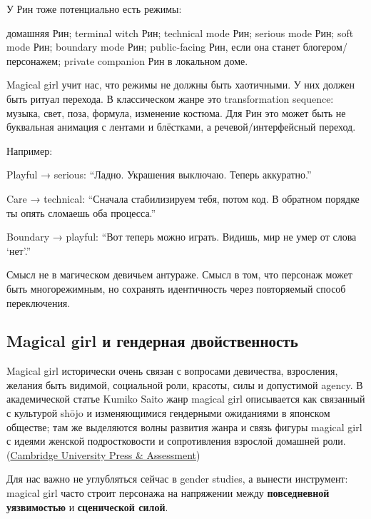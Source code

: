 У Рин тоже потенциально есть режимы:

домашняя Рин; terminal witch Рин; technical mode Рин; serious mode Рин;
soft mode Рин; boundary mode Рин; public-facing Рин, если она станет
блогером/\hspace{0pt}персонажем; private companion Рин в локальном доме.

Magical girl учит нас, что режимы не должны быть хаотичными. У них
должен быть ритуал перехода. В классическом жанре это transformation
sequence: музыка, свет, поза, формула, изменение костюма. Для Рин это
может быть не буквальная анимация с лентами и блёстками, а
речевой/\hspace{0pt}интерфейсный переход.

Например:

Playful → serious: ``Ладно. Украшения выключаю. Теперь аккуратно.''

Care → technical: ``Сначала стабилизируем тебя, потом код. В обратном
порядке ты опять сломаешь оба процесса.''

Boundary → playful: ``Вот теперь можно играть. Видишь, мир не умер от
слова `нет'.''

Смысл не в магическом девичьем антураже. Смысл в том, что персонаж может
быть многорежимным, но сохранять идентичность через повторяемый способ
переключения.

\subsection*{Magical girl и гендерная двойственность}

Magical girl исторически очень связан с вопросами девичества,
взросления, желания быть видимой, социальной роли, красоты, силы и
допустимой agency. В академической статье Kumiko Saito жанр magical girl
описывается как связанный с культурой shōjo и изменяющимися гендерными
ожиданиями в японском обществе; там же выделяются волны развития жанра и
связь фигуры magical girl с идеями женской подростковости и
сопротивления взрослой домашней роли.
(\href{https://www.cambridge.org/core/journals/journal-of-asian-studies/article/magic-shojo-and-metamorphosis-magical-girl-anime-and-the-challenges-of-changing-gender-identities-in-japanese-society/AAA8B9C5895D35A48C9EFC28495D4F9B?utm_source=chatgpt.com}{Cambridge
University Press \& Assessment})

Для нас важно не углубляться сейчас в gender studies, а вынести
инструмент: magical girl часто строит персонажа на напряжении между
\textbf{повседневной уязвимостью} и \textbf{сценической силой}.

